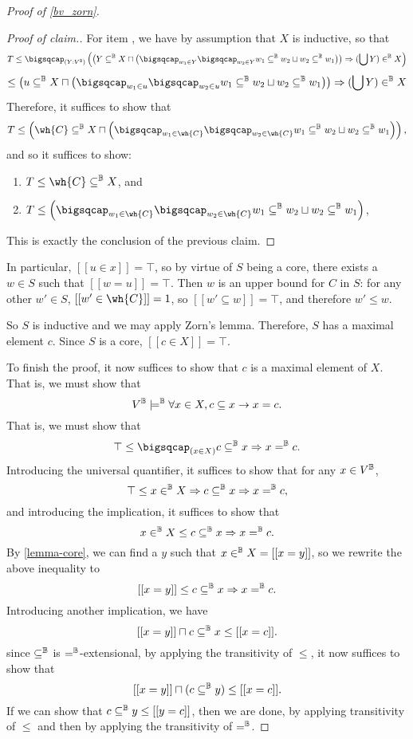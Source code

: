 \documentclass[11pt]{article}
\begin{document}
\begin{proof}[Proof of \ref{bv_zorn}]
\begin{proof}[Proof of claim.]
  For item , we have by assumption that $X$ is inductive, so that
  $$
  T \leq \bigsqcap_{(Y : V^\B)} \left(\left(Y \subseteq^\B X \sqcap \left(\bigsqcap_{w_1 \in Y} \bigsqcap_{w_2 \in Y} w_1 \subseteq^\B w_2 \sqcup w_2 \subseteq^\B w_1\right)\right) \Rightarrow (\bigcup Y) \in^\B X\right)
  $$
  $$
\leq \left(u \subseteq^\B X \sqcap \left(\bigsqcap_{w_1 \in u} \bigsqcap_{w_2 \in u} w_1 \subseteq^\B w_2 \sqcup w_2 \subseteq^\B w_1\right)\right) \Rightarrow (\bigcup Y) \in^\B X
  $$
  Therefore, it suffices to show that
  $$
T \leq \left(\wh{C} \subseteq^\B X \sqcap \left(\bigsqcap_{w_1 \in\wh{C}} \bigsqcap_{w_2 \in\wh{C}} w_1 \subseteq^\B w_2 \sqcup w_2 \subseteq^\B w_1\right)\right),
$$
and so it suffices to show:
\begin{enumerate}
\item $\displaystyle{T \leq\wh{C} \subseteq^\B X}$, and
\item $\displaystyle{T \leq \left(\bigsqcap_{w_1 \in\wh{C}} \bigsqcap_{w_2 \in\wh{C}} w_1 \subseteq^\B w_2 \sqcup w_2 \subseteq^\B w_1\right)}$,
\end{enumerate}

This is exactly the conclusion of the previous claim.
\end{proof}

In particular, $[[u \in x]] = \top$, so by virtue of $S$ being a core, there exists a $w \in S$ such that $[[w = u]] = \top$. Then $w$ is an upper bound for $C$ in $S$: for any other $w' \in S$, $[[w' \in \wh{C}]] = 1$, so $[[w' \subseteq w]] = \top$, and therefore $w' \leq w$.

So $S$ is inductive and we may apply Zorn's lemma. Therefore, $S$ has a maximal element $c$. Since $S$ is a core, $[[c \in X]] = \top$.

To finish the proof, it now suffices to show that $c$ is a maximal element of $X$. That is, we must show that
$$
V^{\mathbb{B}} \models^{\mathbb{B}} \forall x \in X, c \subseteq x \to x = c.
$$
That is, we must show that
$$
\top \leq \bigsqcap_{(x \in X)} c \subseteq^\B x \Rightarrow x =^\B c.
$$
Introducing the universal quantifier, it suffices to show that for any $x \in V^{\mathbb{B}}$,
$$
\top \leq x \in^{\mathbb{B}} X \Rightarrow c \subseteq^{\mathbb{B}} x \Rightarrow x =^{\mathbb{B}} c,
$$
and introducing the implication, it suffices to show that
$$
x \in^{\mathbb{B}} X \leq c \subseteq^{\mathbb{B}} x \Rightarrow x =^{\mathbb{B}} c.
$$
By \ref{lemma-core}, we can find a $y$ such that $x \in^{\mathbb{B}} X = [[x = y]]$, so we rewrite the above inequality to
$$
[[x = y]] \leq c \subseteq^{\mathbb{B}} x \Rightarrow x =^{\mathbb{B}} c.
$$
Introducing another implication, we have
$$
[[x = y]] \sqcap c \subseteq^{\mathbb{B}} x \leq [[x = c]].
$$
since $\subseteq^{\mathbb{B}}$ is $=^{\mathbb{B}}$-extensional, by applying the transitivity of $\leq$, it now suffices to show that
$$
[[x = y]] \sqcap (c \subseteq^{\mathbb{B}} y) \leq [[x = c]].
$$
If we can show that $c \subseteq^{\mathbb{B}} y \leq [[y = c]]$, then we are done, by applying transitivity of $\leq$ and then by applying the transitivity of $=^{\mathbb{B}}$.


\end{proof}
\end{document}
